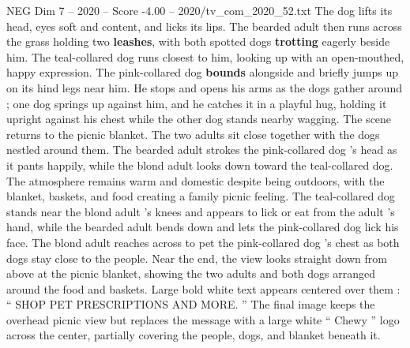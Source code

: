\begin{textsample}{NEG Dim 7 – 2020 – Score -4.00 – 2020/tv\_com\_2020\_52.txt}
The dog lifts its head, eyes soft and content, and licks its lips.
The bearded adult then runs across the grass holding two \textbf{leashes}, with both spotted dogs \textbf{trotting} eagerly beside him.
The teal-collared dog runs closest to him, looking up with an open-mouthed, happy expression.
The pink-collared dog \textbf{bounds} alongside and briefly jumps up on its hind legs near him.
He stops and opens his arms as the dogs gather around ; one dog springs up against him, and he catches it in a playful hug, holding it upright against his chest while the other dog stands nearby wagging.
The scene returns to the picnic blanket.
The two adults sit close together with the dogs nestled around them.
The bearded adult strokes the pink-collared dog ’s head as it pants happily, while the blond adult looks down toward the teal-collared dog.
The atmosphere remains warm and domestic despite being outdoors, with the blanket, baskets, and food creating a family picnic feeling.
The teal-collared dog stands near the blond adult ’s knees and appears to lick or eat from the adult ’s hand, while the bearded adult bends down and lets the pink-collared dog lick his face.
The blond adult reaches across to pet the pink-collared dog ’s chest as both dogs stay close to the people.
Near the end, the view looks straight down from above at the picnic blanket, showing the two adults and both dogs arranged around the food and baskets.
Large bold white text appears centered over them : “ SHOP PET PRESCRIPTIONS AND MORE. ” The final image keeps the overhead picnic view but replaces the message with a large white “ Chewy ” logo across the center, partially covering the people, dogs, and blanket beneath it.

\end{textsample}
